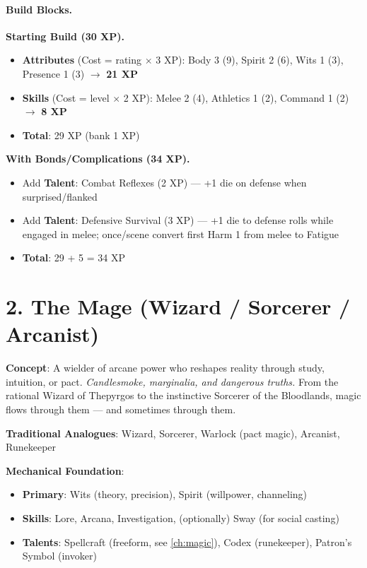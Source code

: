 \paragraph{Build Blocks.}
\textbf{Starting Build (30 XP).}
\begin{itemize}
\item \textbf{Attributes} (Cost = rating $\times$ 3 XP): Body 3 (9), Spirit 2 (6), Wits 1 (3), Presence 1 (3) $\rightarrow$ \textbf{21 XP}
\item \textbf{Skills} (Cost = level $\times$ 2 XP): Melee 2 (4), Athletics 1 (2), Command 1 (2) $\rightarrow$ \textbf{8 XP}
\item \textbf{Total}: 29 XP (bank 1 XP)
\end{itemize}
\textbf{With Bonds/Complications (34 XP).}
\begin{itemize}
\item Add \textbf{Talent}: Combat Reflexes (2 XP) — +1 die on defense when surprised/flanked
\item Add \textbf{Talent}: Defensive Survival (3 XP) — +1 die to defense rolls while engaged in melee; once/scene convert first Harm 1 from melee to Fatigue
\item \textbf{Total}: 29 + 5 = 34 XP
\end{itemize}

\section{2. The Mage (Wizard / Sorcerer / Arcanist)}
\label{sec:concept-mage}

\textbf{Concept}: A wielder of arcane power who reshapes reality through study, intuition, or pact. \emph{Candlesmoke, marginalia, and dangerous truths.} From the rational Wizard of Thepyrgos to the instinctive Sorcerer of the Bloodlands, magic flows through them — and sometimes through them.

\textbf{Traditional Analogues}: Wizard, Sorcerer, Warlock (pact magic), Arcanist, Runekeeper

\textbf{Mechanical Foundation}:
\begin{itemize}
\item \textbf{Primary}: Wits (theory, precision), Spirit (willpower, channeling)
\item \textbf{Skills}: Lore, Arcana, Investigation, (optionally) Sway (for social casting)
\item \textbf{Talents}: Spellcraft (freeform, see \ref{ch:magic}), Codex (runekeeper), Patron’s Symbol (invoker)
\end{itemize}

